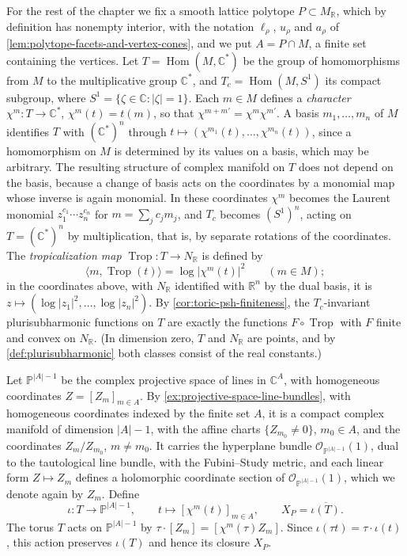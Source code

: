 For the rest of the chapter we fix a smooth lattice polytope $P\subset M_{\mathbb R}$, which by definition has nonempty interior, with the notation $\ell_\rho$, $u_\rho$ and $a_\rho$ of \cref{lem:polytope-facets-and-vertex-cones}, and we put $A=P\cap M$, a finite set containing the vertices. Let $T=\operatorname{Hom}(M,\mathbb C^*)$ be the group of homomorphisms from $M$ to the multiplicative group $\mathbb C^*$, and $T_c=\operatorname{Hom}(M,S^1)$ its compact subgroup, where $S^1=\{\zeta\in\mathbb C:|\zeta|=1\}$. Each $m\in M$ defines a \emph{character} $\chi^m\colon T\to\mathbb C^*$, $\chi^m(t)=t(m)$, so that $\chi^{m+m'}=\chi^m\chi^{m'}$. A basis $m_1,\ldots,m_n$ of $M$ identifies $T$ with $(\mathbb C^*)^n$ through $t\mapsto(\chi^{m_1}(t),\ldots,\chi^{m_n}(t))$, since a homomorphism on $M$ is determined by its values on a basis, which may be arbitrary. The resulting structure of complex manifold on $T$ does not depend on the basis, because a change of basis acts on the coordinates by a monomial map whose inverse is again monomial. In these coordinates $\chi^m$ becomes the Laurent monomial $z_1^{c_1}\cdots z_n^{c_n}$ for $m=\sum_jc_jm_j$, and $T_c$ becomes $(S^1)^n$, acting on $T=(\mathbb C^*)^n$ by multiplication, that is, by separate rotations of the coordinates. The \emph{tropicalization map} $\operatorname{Trop}\colon T\to N_{\mathbb R}$ is defined by
\[
 \langle m,\operatorname{Trop}(t)\rangle=\log|\chi^m(t)|^2\qquad(m\in M);
\]
in the coordinates above, with $N_{\mathbb R}$ identified with $\mathbb R^n$ by the dual basis, it is $z\mapsto(\log|z_1|^2,\ldots,\log|z_n|^2)$. By \cref{cor:toric-psh-finiteness}, the $T_c$-invariant plurisubharmonic functions on $T$ are exactly the functions $F\circ\operatorname{Trop}$ with $F$ finite and convex on $N_{\mathbb R}$. (In dimension zero, $T$ and $N_{\mathbb R}$ are points, and by \cref{def:plurisubharmonic} both classes consist of the real constants.)

Let $\mathbb P^{|A|-1}$ be the complex projective space of lines in $\mathbb C^A$, with homogeneous coordinates $Z=[Z_m]_{m\in A}$. By \cref{ex:projective-space-line-bundles}, with homogeneous coordinates indexed by the finite set $A$, it is a compact complex manifold of dimension $|A|-1$, with the affine charts $\{Z_{m_0}\neq0\}$, $m_0\in A$, and the coordinates $Z_m/Z_{m_0}$, $m\neq m_0$. It carries the hyperplane bundle $\mathcal O_{\mathbb P^{|A|-1}}(1)$, dual to the tautological line bundle, with the Fubini--Study metric, and each linear form $Z\mapsto Z_m$ defines a holomorphic coordinate section of $\mathcal O_{\mathbb P^{|A|-1}}(1)$, which we denote again by $Z_m$. Define
\[
 \iota\colon T\longrightarrow\mathbb P^{|A|-1},\qquad
                       t\longmapsto[\chi^m(t)]_{m\in A},
 \qquad X_P=\overline{\iota(T)}.
\]
The torus $T$ acts on $\mathbb P^{|A|-1}$ by $\tau\cdot[Z_m]=[\chi^m(\tau)Z_m]$. Since $\iota(\tau t)=\tau\cdot\iota(t)$, this action preserves $\iota(T)$ and hence its closure $X_P$.

